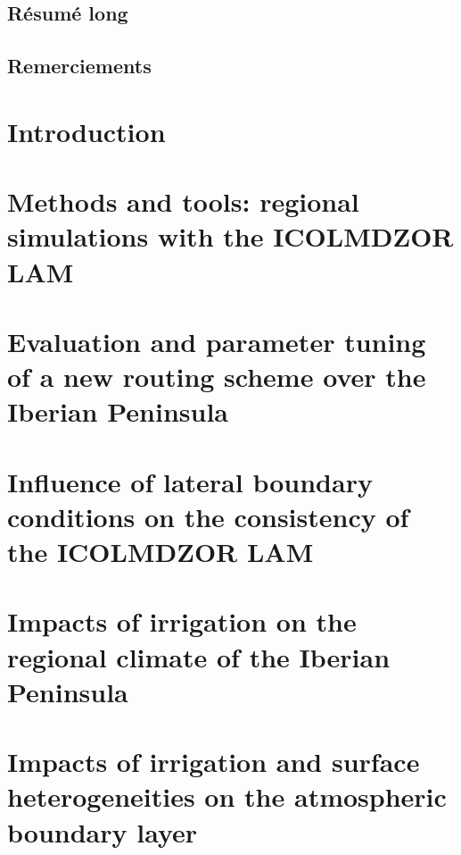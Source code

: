 \documentclass{report}
\begin{document}
\clearpage

\section*{Résumé long}
\section*{Remerciements}

\clearpage
\dominitoc
\renewcommand*\contentsname{Contents}
\tableofcontents
\newpage

\chapter{Introduction}
\label{chap:introduction}
\minitoc
\pagebreak
% 

\chapter{Methods and tools: regional simulations with the ICOLMDZOR LAM}
\label{chap:methods}
\minitoc
\pagebreak
% 

\chapter{Evaluation and parameter tuning of a new routing scheme over the Iberian Peninsula}
\label{chap:routing}
\minitoc
\pagebreak
% 

\chapter{Influence of lateral boundary conditions on the consistency of the ICOLMDZOR LAM}
\label{chap:forcing}
\minitoc
\pagebreak
% 

\chapter{Impacts of irrigation on the regional climate of the Iberian Peninsula}
\label{chap:monthly}
\minitoc
\pagebreak


\chapter{Impacts of irrigation and surface heterogeneities on the atmospheric boundary layer}
\label{chap:liaise}
\minitoc
\pagebreak
% 
\end{document}
